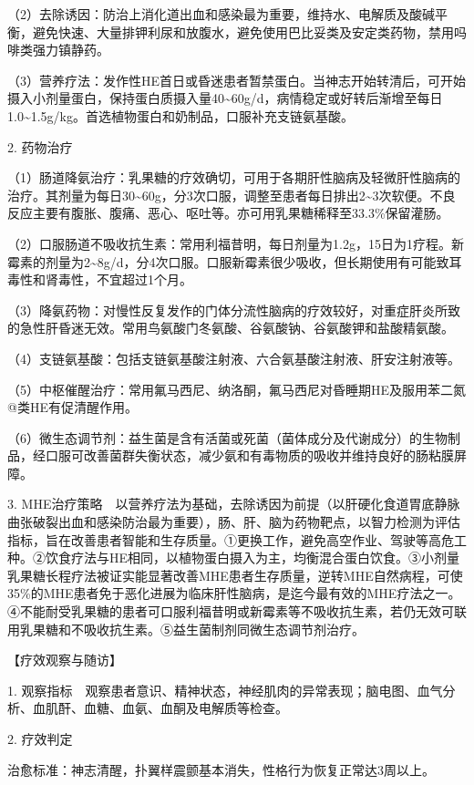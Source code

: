 （2）去除诱因：防治上消化道出血和感染最为重要，维持水、电解质及酸碱平衡，避免快速、大量排钾利尿和放腹水，避免使用巴比妥类及安定类药物，禁用吗啡类强力镇静药。

（3）营养疗法：发作性HE首日或昏迷患者暂禁蛋白。当神志开始转清后，可开始摄入小剂量蛋白，保持蛋白质摄入量40\textasciitilde{}60g/d，病情稳定或好转后渐增至每日1.0\textasciitilde{}1.5g/kg。首选植物蛋白和奶制品，口服补充支链氨基酸。

2. 药物治疗

（1）肠道降氨治疗：乳果糖的疗效确切，可用于各期肝性脑病及轻微肝性脑病的治疗。其剂量为每日30\textasciitilde{}60g，分3次口服，调整至患者每日排出2\textasciitilde{}3次软便。不良反应主要有腹胀、腹痛、恶心、呕吐等。亦可用乳果糖稀释至33.3\%保留灌肠。

（2）口服肠道不吸收抗生素：常用利福昔明，每日剂量为1.2g，15日为1疗程。新霉素的剂量为2\textasciitilde{}8g/d，分4次口服。口服新霉素很少吸收，但长期使用有可能致耳毒性和肾毒性，不宜超过1个月。

（3）降氨药物：对慢性反复发作的门体分流性脑病的疗效较好，对重症肝炎所致的急性肝昏迷无效。常用鸟氨酸门冬氨酸、谷氨酸钠、谷氨酸钾和盐酸精氨酸。

（4）支链氨基酸：包括支链氨基酸注射液、六合氨基酸注射液、肝安注射液等。

（5）中枢催醒治疗：常用氟马西尼、纳洛酮，氟马西尼对昏睡期HE及服用苯二氮@类HE有促清醒作用。

（6）微生态调节剂：益生菌是含有活菌或死菌（菌体成分及代谢成分）的生物制品，经口服可改善菌群失衡状态，减少氨和有毒物质的吸收并维持良好的肠粘膜屏障。

3.
MHE治疗策略　以营养疗法为基础，去除诱因为前提（以肝硬化食道胃底静脉曲张破裂出血和感染防治最为重要），肠、肝、脑为药物靶点，以智力检测为评估指标，旨在改善患者智能和生存质量。①更换工作，避免高空作业、驾驶等高危工种。②饮食疗法与HE相同，以植物蛋白摄入为主，均衡混合蛋白饮食。③小剂量乳果糖长程疗法被证实能显著改善MHE患者生存质量，逆转MHE自然病程，可使35\%的MHE患者免于恶化进展为临床肝性脑病，是迄今最有效的MHE疗法之一。④不能耐受乳果糖的患者可口服利福昔明或新霉素等不吸收抗生素，若仍无效可联用乳果糖和不吸收抗生素。⑤益生菌制剂同微生态调节剂治疗。

【疗效观察与随访】

1.
观察指标　观察患者意识、精神状态，神经肌肉的异常表现；脑电图、血气分析、血肌酐、血糖、血氨、血酮及电解质等检查。

2. 疗效判定

治愈标准：神志清醒，扑翼样震颤基本消失，性格行为恢复正常达3周以上。

